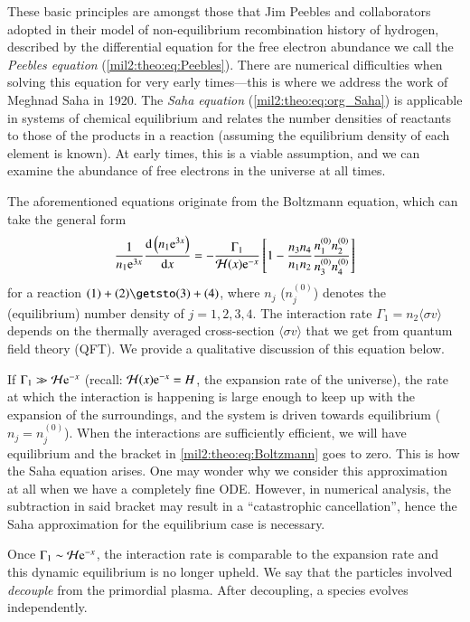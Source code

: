 These basic principles are amongst those that Jim Peebles and collaborators~\citep[see][]{Peebles1968} adopted in their model of non-equilibrium recombination history of hydrogen, described by the differential equation for the free electron abundance we call the \textit{Peebles equation} (\cref{mil2:theo:eq:Peebles}). There are numerical difficulties when solving this equation for very early times---this is where we address the work of Meghnad Saha in 1920. The \textit{Saha equation} (\cref{mil2:theo:eq:org_Saha}) is applicable in systems of chemical equilibrium and relates the number densities of reactants to those of the products in a reaction (assuming the equilibrium density of each element is known). At early times, this is a viable assumption, and we can examine the abundance of free electrons in the universe at all times.~\citep{Peebles1968,ChungPei1995,Callin2006}

The aforementioned equations originate from the Boltzmann equation, which can take the general form
\begin{equation}\label{mil2:theo:eq:Boltzmann}
    \frac{1}{n_1 \mathrm{e}^{3x}} \dv{\left(n_1\ensuremath{\mathrm{e}}^{3x}\right)}{x} = - \frac{\Gamma_1}{\mathcal{H}(x)\mathrm{e}^{-x}} \left[1- \frac{n_3 n_4}{n_1 n_2} \frac{n_1^{(0)} n_2^{(0)}}{n_3^{(0)} n_4^{(0)}}  \right]
\end{equation}
for a reaction $(1) + (2) \getsto (3) + (4)$, where $n_j$ ($n_j^{(0)}$) denotes the (equilibrium) number density of $j=1,2,3,4$. The interaction rate $\Gamma_1 = n_2 \langle\sigma v\rangle$ depends on the thermally averaged cross-section $\langle\sigma v\rangle$ that we get from quantum field theory (QFT). We provide a qualitative discussion of this equation below.

If $\Gamma_1 \gg \mathcal{H}\mathrm{e}^{-x}$ (recall: $\mathcal{H}(x)\mathrm{e}^{-x}= H$, the expansion rate of the universe), the rate at which the interaction is happening is large enough to keep up with the expansion of the surroundings, and the system is driven towards equilibrium ($n_j = n_j^{(0)}$). When the interactions are sufficiently efficient, we will have equilibrium and the bracket in \cref{mil2:theo:eq:Boltzmann} goes to zero. This is how the Saha equation arises. One may wonder why we consider this approximation at all when we have a completely fine ODE. However, in numerical analysis, the subtraction in said bracket may result in a ``catastrophic cancellation'', hence the Saha approximation for the equilibrium case is necessary.

Once $\Gamma_1 \sim \mathcal{H}\mathrm{e}^{-x}$, the interaction rate is comparable to the expansion rate and this dynamic equilibrium is no longer upheld. We say that the particles involved \textit{decouple} from the primordial plasma. After decoupling, a species evolves independently.


